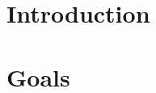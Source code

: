 \documentclass[./main.tex]{subfiles}
\begin{document}
  \section{Introduction}
\section{Goals}
\end{document}
